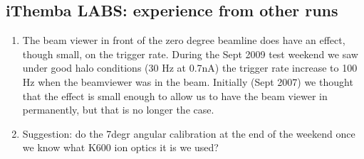 \documentclass[11pt]{report}
\begin{document}
\subsection{iThemba LABS: experience from other runs}
\begin{enumerate}

\item  The beam viewer in front of the zero degree beamline does 
have an effect, though small, on the trigger rate. During the Sept 2009 test weekend
we saw under good halo conditions (30 Hz at 0.7nA) the trigger rate increase to 100 Hz 
when the beamviewer was in the beam.
Initially (Sept 2007) we thought that the effect is small enough to allow us to have
the beam viewer in permanently, but that is no longer the case.

\item Suggestion: do the  7degr angular calibration
at the end of the weekend once we know what K600 ion optics it is we used?


\end{enumerate}
\end{document}
